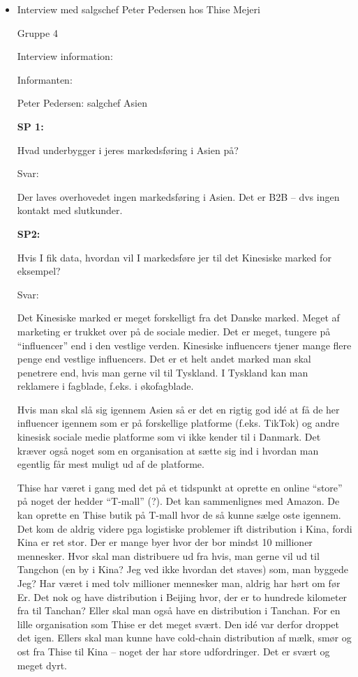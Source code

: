 \documentclass[
  12pt,
  a4paper,
  DIV=11,
  numbers=noendperiod]{scrartcl}
\begin{document}
\begin{itemize}
\item
  Interview med salgschef Peter Pedersen hos Thise Mejeri~

  Gruppe 4~

  Interview information:~

  Informanten:~

  Peter Pedersen: salgchef Asien~

  \textbf{SP 1:}~

  Hvad underbygger i jeres markedsføring i Asien på?~

  Svar:~

  Der laves overhovedet ingen markedsføring i Asien. Det er B2B -- dvs
  ingen kontakt med slutkunder.~

  \textbf{SP2:}~

  Hvis I fik data, hvordan vil I markedsføre jer til det Kinesiske
  marked for eksempel?~

  Svar:~

  Det Kinesiske marked er meget forskelligt fra det Danske marked. Meget
  af marketing er trukket over på de sociale medier. Det er meget,
  tungere på ``influencer'' end i den vestlige verden. Kinesiske
  influencers tjener mange flere penge end vestlige influencers. Det er
  et helt andet marked man skal penetrere end, hvis man gerne vil til
  Tyskland. I Tyskland kan man reklamere i fagblade, f.eks. i
  økofagblade.~

  Hvis man skal slå sig igennem Asien så er det en rigtig god idé at få
  de her influencer igennem som er på forskellige platforme (f.eks.
  TikTok) og andre kinesisk sociale medie platforme som vi ikke kender
  til i Danmark. Det kræver også noget som en organisation at sætte sig
  ind i hvordan man egentlig får mest muligt ud af de platforme.~

  Thise har været i gang med det på et tidspunkt at oprette en online
  ``store'' på noget der hedder ``T-mall'' (?). Det kan sammenlignes med
  Amazon. De kan oprette en Thise butik på T-mall hvor de så kunne sælge
  oste igennem. Det kom de aldrig videre pga logistiske problemer ift
  distribution i Kina, fordi Kina er ret stor. Der er mange byer hvor
  der bor mindst 10 millioner mennesker. Hvor skal man distribuere ud
  fra hvis, man gerne vil ud til Tangchon (en by i Kina? Jeg ved ikke
  hvordan det staves) som, man byggede Jeg? Har været i med tolv
  millioner mennesker man, aldrig har hørt om før Er. Det nok og have
  distribution i Beijing hvor, der er to hundrede kilometer fra til
  Tanchan? Eller skal man også have en distribution i Tanchan. For en
  lille organisation som Thise er det meget svært. Den idé var derfor
  droppet det igen. Ellers skal man kunne have cold-chain distribution
  af mælk, smør og ost fra Thise til Kina -- noget der har store
  udfordringer. Det er svært og meget dyrt.~


\end{itemize}
\end{document}
